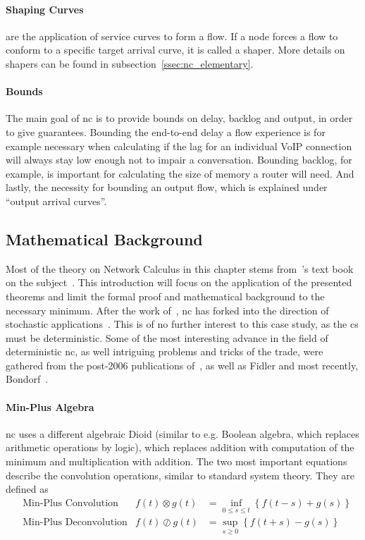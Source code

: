 \paragraph{Shaping Curves} are the application of service curves to form a flow.
If a node forces a flow to conform to a specific target arrival curve, it is called a shaper. More details on shapers can be found in subsection~\ref{ssec:nc_elementary}.
\paragraph{Bounds}
The main goal of \gls{nc} is to provide bounds on delay, backlog and output, in order to give guarantees. Bounding the end-to-end delay a flow experience is for example necessary when calculating if the lag
for an individual VoIP connection will always stay low enough not to impair a conversation. Bounding backlog, for example, is important for calculating the size of memory a router will need.
And lastly, the necessity for bounding an output flow, which is explained under \enquote{output arrival curves}.


\subsection{Mathematical Background}
Most of the theory on Network Calculus in this chapter stems from~\citeauthor{thiran_network_2001}'s text book on the subject~\cite{thiran_network_2001}.
This introduction will focus on the application of the presented theorems and limit the formal proof and mathematical background to the necessary minimum.
After the work of~\citeauthor{thiran_network_2001}, \gls{nc} has forked into the direction of stochastic applications~\cite{jiang_basic_2006}. This is of no further interest to this
case study, as the  \gls{cs} must be deterministic. Some of the most interesting advance in the field of deterministic \gls{nc}, as well intriguing problems and tricks of the trade,
were gathered from the post-2006 publications of~\citeauthor{schmitt_comprehensive_2007}, as well as Fidler and most recently, Bondorf~\cite{schmitt_comprehensive_2007,fidler_way_2006,schmitt_delay_2008,bondorf_discodnc_2014,bondorf_improving_2016}.

\paragraph{Min-Plus Algebra}
\gls{nc} uses a different algebraic Dioid (similar to e.g. Boolean algebra, which replaces arithmetic operations by logic), which replaces addition with computation of the minimum
and multiplication with addition. The two most important equations describe the convolution operations, similar to standard system theory. They are defined as
%
\begin{equation}
\begin{aligned}
&\text{Min-Plus Convolution} &f(t) \otimes g(t) &= \inf_{0 \le s \le t} \left\{f(t-s) + g(s) \right\} \\[8pt]
&\text{Min-Plus Deconvolution}&f(t) \oslash g(t) &= \sup_{s \ge 0} \left\{f(t+s) - g(s) \right\}\\
\end{aligned}
\end{equation}
%
